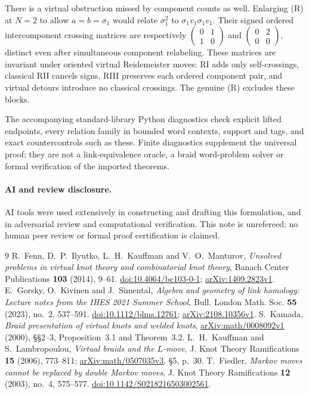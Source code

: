 \documentclass[11pt]{article}
\newcommand{\sig}{\sigma}
\begin{document}
There is a virtual obstruction missed by component counts as well. Enlarging
(R) at $N=2$ to allow $a=b=\sig_1$ would relate $\sig_1^2$ to
$\sig_1v_1\sig_1v_1$. Their signed ordered intercomponent crossing matrices are
respectively $\left(\begin{smallmatrix}0&1\\1&0\end{smallmatrix}\right)$ and
$\left(\begin{smallmatrix}0&2\\0&0\end{smallmatrix}\right)$, distinct even after
simultaneous component relabeling. These matrices are invariant under oriented
virtual Reidemeister moves: RI adds only self-crossings, classical RII cancels
signs, RIII preserves each ordered component pair, and virtual detours introduce
no classical crossings.
The genuine (R) excludes these blocks.

The accompanying standard-library Python diagnostics check explicit lifted
endpoints, every relation family in bounded word contexts, support and tags,
and exact countercontrols such as these. Finite diagnostics supplement the
universal proof; they are not a link-equivalence oracle, a braid word-problem
solver or formal verification of the imported theorems.

\paragraph{AI and review disclosure.}
AI tools were used extensively in constructing and drafting this formulation,
and in adversarial review and computational verification. This note is
unrefereed; no human peer review or formal proof certification is claimed.

\begin{thebibliography}{9}
 R.~Fenn, D.~P.~Ilyutko, L.~H.~Kauffman and V.~O.~Manturov,
\emph{Unsolved problems in virtual knot theory and combinatorial knot theory},
Banach Center Publications \textbf{103} (2014), 9--61.
\href{https://doi.org/10.4064/bc103-0-1}{doi:10.4064/bc103-0-1};
\href{https://arxiv.org/abs/1409.2823v1}{arXiv:1409.2823v1}.
 E.~Gorsky, O.~Kivinen and J.~Simental,
\emph{Algebra and geometry of link homology: Lecture notes from the IHES 2021 Summer School},
Bull. London Math. Soc. \textbf{55} (2023), no.~2, 537--591.
\href{https://doi.org/10.1112/blms.12761}{doi:10.1112/blms.12761};
\href{https://arxiv.org/abs/2108.10356v1}{arXiv:2108.10356v1}.
 S.~Kamada,
\emph{Braid presentation of virtual knots and welded knots},
\href{https://arxiv.org/abs/math/0008092v1}{arXiv:math/0008092v1} (2000),
\S\S2--3, Proposition~3.1 and Theorem~3.2.
 L.~H.~Kauffman and S.~Lambropoulou,
\emph{Virtual braids and the $L$-move},
J. Knot Theory Ramifications \textbf{15} (2006), 773--811;
\href{https://arxiv.org/abs/math/0507035v3}{arXiv:math/0507035v3}, \S5, p.~30.
 T.~Fiedler,
\emph{Markov moves cannot be replaced by double Markov moves},
J. Knot Theory Ramifications \textbf{12} (2003), no.~4, 575--577.
\href{https://doi.org/10.1142/S0218216503002561}{doi:10.1142/S0218216503002561}.
\end{thebibliography}
\end{document}
